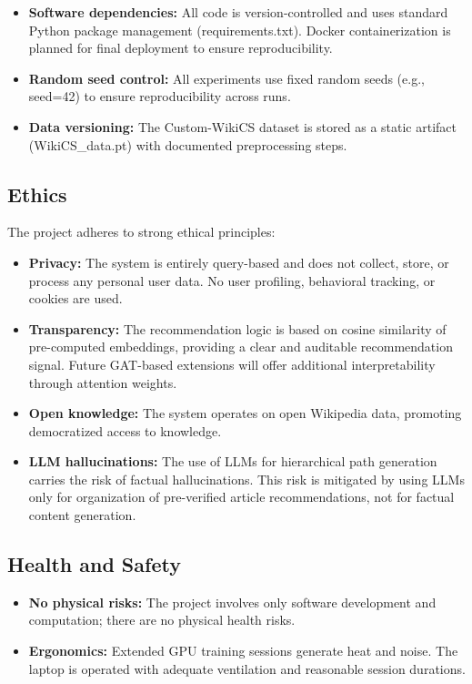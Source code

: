 \begin{itemize}
    \item \textbf{Software dependencies:} All code is version-controlled and uses standard Python package management (requirements.txt). Docker containerization is planned for final deployment to ensure reproducibility.
    \item \textbf{Random seed control:} All experiments use fixed random seeds (e.g., seed=42) to ensure reproducibility across runs.
    \item \textbf{Data versioning:} The Custom-WikiCS dataset is stored as a static artifact (WikiCS\_data.pt) with documented preprocessing steps.
\end{itemize}

\subsection{Ethics}

The project adheres to strong ethical principles:

\begin{itemize}
    \item \textbf{Privacy:} The system is entirely query-based and does not collect, store, or process any personal user data. No user profiling, behavioral tracking, or cookies are used.
    \item \textbf{Transparency:} The recommendation logic is based on cosine similarity of pre-computed embeddings, providing a clear and auditable recommendation signal. Future GAT-based extensions will offer additional interpretability through attention weights.
    \item \textbf{Open knowledge:} The system operates on open Wikipedia data, promoting democratized access to knowledge.
    \item \textbf{LLM hallucinations:} The use of LLMs for hierarchical path generation carries the risk of factual hallucinations. This risk is mitigated by using LLMs only for organization of pre-verified article recommendations, not for factual content generation.
\end{itemize}

\subsection{Health and Safety}

\begin{itemize}
    \item \textbf{No physical risks:} The project involves only software development and computation; there are no physical health risks.
    \item \textbf{Ergonomics:} Extended GPU training sessions generate heat and noise. The laptop is operated with adequate ventilation and reasonable session durations.
\end{itemize}

